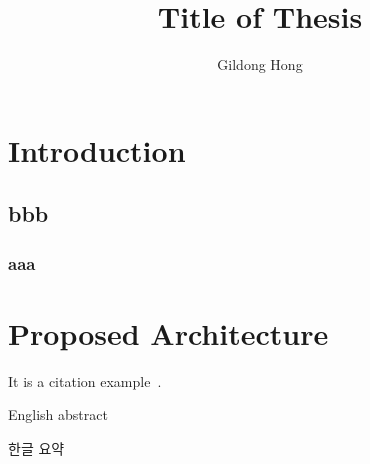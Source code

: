 \documentclass[doctor,english,final]{knu-ucs}
\title{Title of Thesis}
\author{Gildong Hong}
\begin{document}
    \maketitle
    \makeapproval
\restoregeometry

    \tableofcontents

    \listoftables

    \listoffigures



\chapter{Introduction}
\lipsum %



\section{bbb}
\lipsum


\subsection{aaa}
\lipsum


\chapter{Proposed Architecture}
It is a citation example~\cite{Moin1998}.





\newpage
\begin{summaryenglish}
    English abstract
\end{summaryenglish}
    
\newpage
\begin{summarykorean}
    한글 요약
\end{summarykorean}




\end{document}
